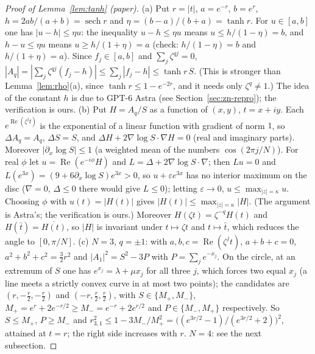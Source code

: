 \documentclass[11pt,a4paper]{article}
\theoremstyle{plain}
\theoremstyle{definition}
\theoremstyle{remark}
\numberwithin{equation}{section}
\begin{document}
\begin{proof}[Proof of Lemma~\ref{lem:tanh} (paper)]
(a) Put $r=|t|$, $a=e^{-r}$, $b=e^{r}$, $h=2ab/(a+b)=\operatorname{sech}r$ and $\eta=(b-a)/(b+a)=\tanh r$. For $u\in[a,b]$ one has $|u-h|\le\eta u$: the inequality $u-h\le\eta u$ means $u\le h/(1-\eta)=b$, and $h-u\le\eta u$ means $u\ge h/(1+\eta)=a$ (check: $h/(1-\eta)=b$ and $h/(1+\eta)=a$). Since $f_j\in[a,b]$ and $\sum_j\zeta^{qj}=0$, $|A_q|=|\sum_j\zeta^{qj}(f_j-h)|\le\sum_j|f_j-h|\le\tanh r\,S$. (This is stronger than Lemma~\ref{lem:rho}(a), since $\tanh r\le1-e^{-2r}$, and it needs only $\zeta^q\ne1$.) The idea of the constant $h$ is due to GPT-6 Astra (see Section~\ref{sec:zn-repro}); the verification is ours.
(b) Put $H=A_q/S$ as a function of $(x,y)$, $t=x+iy$. Each $e^{\operatorname{Re}(\zeta^jt)}$ is the exponential of a linear function with gradient of norm $1$, so $\Delta A_q=A_q$, $\Delta S=S$, and $\Delta H+2\nabla\log S\cdot\nabla H=0$ (real and imaginary parts). Moreover $|\partial_x\log S|\le1$ (a weighted mean of the numbers $\cos(2\pi j/N)$). For real $\phi$ let $u=\operatorname{Re}(e^{-i\phi}H)$ and $L=\Delta+2\nabla\log S\cdot\nabla$; then $Lu=0$ and $L(e^{3x})=(9+6\partial_x\log S)e^{3x}>0$, so $u+\varepsilon e^{3x}$ has no interior maximum on the disc ($\nabla=0$, $\Delta\le0$ there would give $L\le0$); letting $\varepsilon\to0$, $u\le\max_{|z|=\kappa}u$. Choosing $\phi$ with $u(t)=|H(t)|$ gives $|H(t)|\le\max_{|z|=\kappa}|H|$. (The argument is Astra's; the verification is ours.) Moreover $H(\zeta t)=\zeta^{-q}H(t)$ and $H(\bar t)=\overline{H(t)}$, so $|H|$ is invariant under $t\mapsto\zeta t$ and $t\mapsto\bar t$, which reduces the angle to $[0,\pi/N]$.
(c) $N=3$, $q=\pm1$: with $a,b,c=\operatorname{Re}(\zeta^jt)$, $a+b+c=0$, $a^2+b^2+c^2=\tfrac32r^2$ and $|A_1|^2=S^2-3P$ with $P=\sum_je^{-x_j}$. On the circle, at an extremum of $S$ one has $e^{x_j}=\lambda+\mu x_j$ for all three $j$, which forces two equal $x_j$ (a line meets a strictly convex curve in at most two points); the candidates are $(r,-\tfrac r2,-\tfrac r2)$ and $(-r,\tfrac r2,\tfrac r2)$, with $S\in\{M_+,M_-\}$, $M_+=e^r+2e^{-r/2}\ge M_-=e^{-r}+2e^{r/2}$ and $P\in\{M_-,M_+\}$ respectively. So $S\le M_+$, $P\ge M_-$ and $r_{3,1}^2\le1-3M_-/M_+^2=\bigl((e^{3r/2}-1)/(e^{3r/2}+2)\bigr)^2$, attained at $t=r$; the right side increases with $r$. $N=4$: see the next subsection.
\end{proof}
\end{document}
